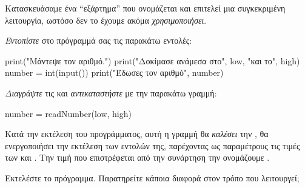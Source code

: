 \documentclass[a4paper,11pt,oneside]{book}
\begin{document}
\begin{step}
Κατασκευάσαμε ένα ``εξάρτημα'' που ονομάζεται  και επιτελεί μια συγκεκριμένη λειτουργία, ωστόσο δεν το έχουμε ακόμα \emph{χρησιμοποιήσει}.

\emph{Εντοπίστε} στο πρόγραμμά σας τις παρακάτω εντολές:

\begin{pyplain}
    print("Μάντεψε τον αριθμό.")
    print("Δοκίμασε ανάμεσα στο", low, "και το", high)
    number = int(input())    
    print("Έδωσες τον αριθμό", number)
\end{pyplain}

\emph{Διαγράψτε} τις και \emph{αντικαταστήστε} με την παρακάτω γραμμή:

\begin{pynew}
    number = readNumber(low, high)
\end{pynew}

Κατά την εκτέλεση του προγράμματος, αυτή η γραμμή θα \emph{καλέσει} την , θα ενεργοποιήσει την εκτέλεση των εντολών της, παρέχοντας ως παραμέτρους τις τιμές των  και . Την τιμή που επιστρέφεται από την συνάρτηση την ονομάζουμε .

Εκτελέστε το πρόγραμμα. Παρατηρείτε κάποια διαφορά στον τρόπο που λειτουργεί;

\marginnote[14pt]{\icondiscuss}
\dottedline
\end{step}
\end{document}
